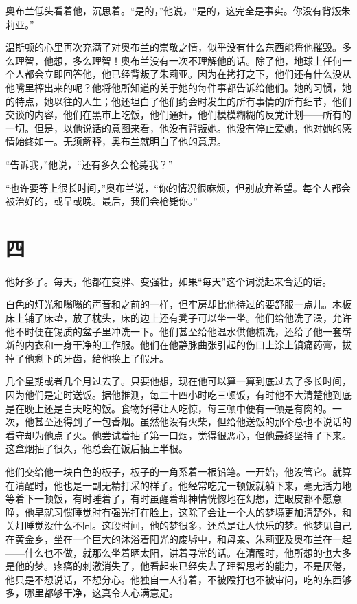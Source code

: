 奥布兰低头看着他，沉思着。``是的，''他说，``是的，这完全是事实。你没有背叛朱莉亚。''

温斯顿的心里再次充满了对奥布兰的崇敬之情，似乎没有什么东西能将他摧毁。多么理智，他想，多么理智！奥布兰没有一次不理解他的话。除了他，地球上任何一个人都会立即回答他，他已经背叛了朱莉亚。因为在拷打之下，他们还有什么没从他嘴里榨出来的呢？他将他所知道的关于她的每件事都告诉给他们。她的习惯，她的特点，她以往的人生；他还坦白了他们约会时发生的所有事情的所有细节，他们交谈的内容，他们在黑市上吃饭，他们通奸，他们模模糊糊的反党计划——所有的一切。但是，以他说话的意图来看，他没有背叛她。他没有停止爱她，他对她的感情始终如一。无须解释，奥布兰就明白了他的意思。

``告诉我，''他说，``还有多久会枪毙我？''

``也许要等上很长时间，''奥布兰说，``你的情况很麻烦，但别放弃希望。每个人都会被治好的，或早或晚。最后，我们会枪毙你。''

\section*{四}\label{ux4e8cux5341ux4e8c}

他好多了。每天，他都在变胖、变强壮，如果``每天''这个词说起来合适的话。

白色的灯光和嗡嗡的声音和之前的一样，但牢房却比他待过的要舒服一点儿。木板床上铺了床垫，放了枕头，床的边上还有凳子可以坐一坐。他们给他洗了澡，允许他不时便在锡质的盆子里冲洗一下。他们甚至给他温水供他梳洗，还给了他一套崭新的内衣和一身干净的工作服。他们在他静脉曲张引起的伤口上涂上镇痛药膏，拔掉了他剩下的牙齿，给他换上了假牙。

几个星期或者几个月过去了。只要他想，现在他可以算一算到底过去了多长时间，因为他们是定时送饭。据他推测，每二十四小时吃三顿饭，有时他不大清楚他到底是在晚上还是白天吃的饭。食物好得让人吃惊，每三顿中便有一顿是有肉的。一次，他甚至还得到了一包香烟。虽然他没有火柴，但给他送饭的那个总也不说话的看守却为他点了火。他尝试着抽了第一口烟，觉得很恶心，但他最终坚持了下来。这盒烟抽了很久，他总会在饭后抽上半根。

他们交给他一块白色的板子，板子的一角系着一根铅笔。一开始，他没管它。就算在清醒时，他也是一副无精打采的样子。他经常吃完一顿饭就躺下来，毫无活力地等着下一顿饭，有时睡着了，有时虽醒着却神情恍惚地在幻想，连眼皮都不愿意睁，他早就习惯睡觉时有强光打在脸上，这除了会让一个人的梦境更加清楚外，和关灯睡觉没什么不同。这段时间，他的梦很多，还总是让人快乐的梦。他梦见自己在黄金乡，坐在一个巨大的沐浴着阳光的废墟中，和母亲、朱莉亚及奥布兰在一起——什么也不做，就那么坐着晒太阳，讲着寻常的话。在清醒时，他所想的也大多是他的梦。疼痛的刺激消失了，他看起来已经失去了理智思考的能力，不是厌倦，他只是不想说话，不想分心。他独自一人待着，不被殴打也不被审问，吃的东西够多，哪里都够干净，这真令人心满意足。

